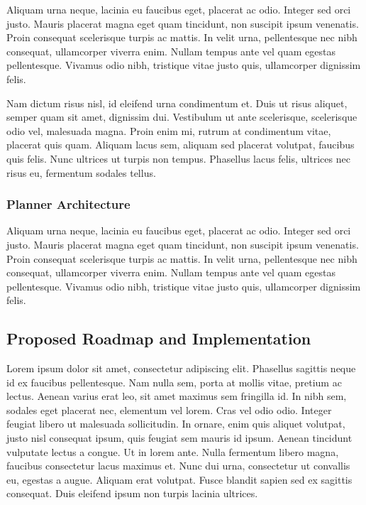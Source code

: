 \documentclass{two-col-epfl}
\begin{document}
Aliquam urna neque, lacinia eu faucibus eget, placerat ac odio. Integer sed orci justo. Mauris placerat magna eget quam tincidunt, non suscipit ipsum venenatis. Proin consequat scelerisque turpis ac mattis. In velit urna, pellentesque nec nibh consequat, ullamcorper viverra enim. Nullam tempus ante vel quam egestas pellentesque. Vivamus odio nibh, tristique vitae justo quis, ullamcorper dignissim felis.

Nam dictum risus nisl, id eleifend urna condimentum et. Duis ut risus aliquet, semper quam sit amet, dignissim dui. Vestibulum ut ante scelerisque, scelerisque odio vel, malesuada magna. Proin enim mi, rutrum at condimentum vitae, placerat quis quam. Aliquam lacus sem, aliquam sed placerat volutpat, faucibus quis felis. Nunc ultrices ut turpis non tempus. Phasellus lacus felis, ultrices nec risus eu, fermentum sodales tellus.

\subsubsection{Planner Architecture}


Aliquam urna neque, lacinia eu faucibus eget, placerat ac odio. Integer sed orci justo. Mauris placerat magna eget quam tincidunt, non suscipit ipsum venenatis. Proin consequat scelerisque turpis ac mattis. In velit urna, pellentesque nec nibh consequat, ullamcorper viverra enim. Nullam tempus ante vel quam egestas pellentesque. Vivamus odio nibh, tristique vitae justo quis, ullamcorper dignissim felis.

\subsection{Proposed Roadmap and Implementation}
Lorem ipsum dolor sit amet, consectetur adipiscing elit. Phasellus sagittis neque id ex faucibus pellentesque. Nam nulla sem, porta at mollis vitae, pretium ac lectus. Aenean varius erat leo, sit amet maximus sem fringilla id. In nibh sem, sodales eget placerat nec, elementum vel lorem. Cras vel odio odio. Integer feugiat libero ut malesuada sollicitudin. In ornare, enim quis aliquet volutpat, justo nisl consequat ipsum, quis feugiat sem mauris id ipsum. Aenean tincidunt vulputate lectus a congue. Ut in lorem ante. Nulla fermentum libero magna, faucibus consectetur lacus maximus et. Nunc dui urna, consectetur ut convallis eu, egestas a augue. Aliquam erat volutpat. Fusce blandit sapien sed ex sagittis consequat. Duis eleifend ipsum non turpis lacinia ultrices.
\end{document}
